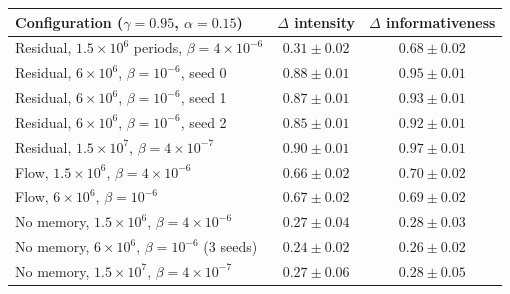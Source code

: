 \begin{tabular}{lcc}
\toprule
Configuration ($\gamma=0.95$, $\alpha=0.15$) & $\Delta$ intensity & $\Delta$ informativeness \\
\midrule
Residual, $1.5\times10^6$ periods, $\beta=4\times10^{-6}$ & $0.31 \pm 0.02$ & $0.68 \pm 0.02$ \\
Residual, $6\times10^6$, $\beta=10^{-6}$, seed 0 & $0.88 \pm 0.01$ & $0.95 \pm 0.01$ \\
Residual, $6\times10^6$, $\beta=10^{-6}$, seed 1 & $0.87 \pm 0.01$ & $0.93 \pm 0.01$ \\
Residual, $6\times10^6$, $\beta=10^{-6}$, seed 2 & $0.85 \pm 0.01$ & $0.92 \pm 0.01$ \\
Residual, $1.5\times10^7$, $\beta=4\times10^{-7}$ & $0.90 \pm 0.01$ & $0.97 \pm 0.01$ \\
Flow, $1.5\times10^6$, $\beta=4\times10^{-6}$ & $0.66 \pm 0.02$ & $0.70 \pm 0.02$ \\
Flow, $6\times10^6$, $\beta=10^{-6}$ & $0.67 \pm 0.02$ & $0.69 \pm 0.02$ \\
No memory, $1.5\times10^6$, $\beta=4\times10^{-6}$ & $0.27 \pm 0.04$ & $0.28 \pm 0.03$ \\
No memory, $6\times10^6$, $\beta=10^{-6}$ (3 seeds) & $0.24 \pm 0.02$ & $0.26 \pm 0.02$ \\
No memory, $1.5\times10^7$, $\beta=4\times10^{-7}$ & $0.27 \pm 0.06$ & $0.28 \pm 0.05$ \\
\bottomrule
\end{tabular}